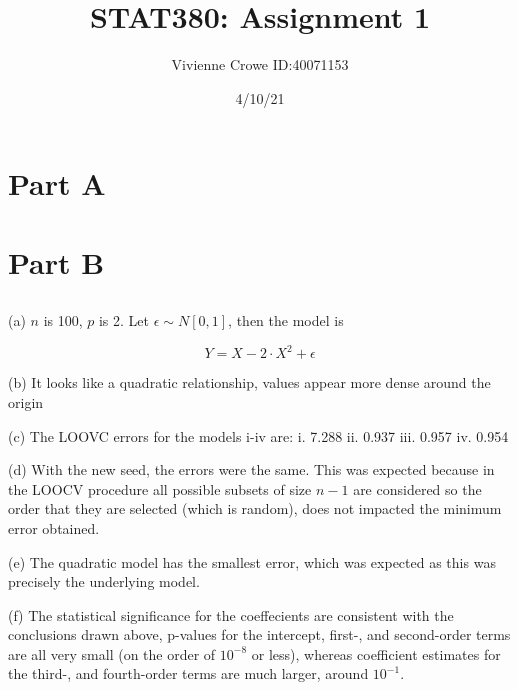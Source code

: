 \documentclass{article}
\begin{document}
    \raggedright
    \title{STAT380: Assignment 1  \\}
    \author{Vivienne Crowe ID:40071153}
    \date{4/10/21}
    
    \maketitle

    \section{Part A}

    \section{Part B}

    \subsection{}
    \subsection{}

    

    \subsection{}

    (a)
    $n$ is 100, $p$ is 2. Let $\epsilon \sim N[0,1]$, then the model is

    \[Y = X-2 \cdot X^2 + \epsilon\]

    (b) It looks like a quadratic relationship, values appear more dense around the origin

    (c) The LOOVC errors for the models i-iv are:
    i. 7.288
    ii. 0.937 
    iii. 0.957 
    iv. 0.954

    (d) With the new seed, the errors were the same. This was expected 
    because in the LOOCV procedure all possible subsets of size $n-1$ are 
    considered so the order that they are selected (which is random), does not 
    impacted the minimum error obtained.

    (e) The quadratic model has the smallest error, which was expected as this 
    was precisely the underlying model.

    (f) The statistical significance for the coeffecients are consistent with the 
    conclusions drawn above, p-values for the intercept, first-, and second-order terms are all 
    very small (on the order of $10^{-8}$ or less), whereas coefficient estimates for the third-, 
    and fourth-order terms are much larger, around $10^{-1}$.
 
\end{document}
